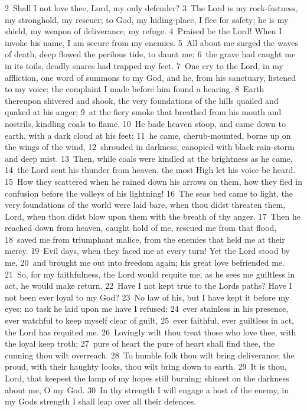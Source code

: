 \documentclass[10pt]{book} %
\begin{document}
\textcolor{benred8}{2}~Shall I not love thee, Lord, my only defender? \textcolor{benred8}{3}~The Lord is my rock-fastness, my stronghold, my rescuer; to God, my hiding-place, I flee for safety; he is my shield, my weapon of deliverance, my refuge. \textcolor{benred8}{4}~Praised be the Lord! When I invoke his name, I am secure from my enemies. \textcolor{benred8}{5}~All about me surged the waves of death, deep flowed the perilous tide, to daunt me; \textcolor{benred8}{6}~the grave had caught me in its toils, deadly snares had trapped my feet. \textcolor{benred8}{7}~One cry to the Lord, in my affliction, one word of summons to my God, and he, from his sanctuary, listened to my voice; the complaint I made before him found a hearing.
\textcolor{benred8}{8}~Earth thereupon shivered and shook, the very foundations of the hills quailed and quaked at his anger; \textcolor{benred8}{9}~at the fiery smoke that breathed from his mouth and nostrils, kindling coals to flame. \textcolor{benred8}{10}~He bade heaven stoop, and came down to earth, with a dark cloud at his feet; \textcolor{benred8}{11}~he came, cherub-mounted, borne up on the wings of the wind, \textcolor{benred8}{12}~shrouded in darkness, canopied with black rain-storm and deep mist. \textcolor{benred8}{13}~Then, while coals were kindled at the brightness as he came, \textcolor{benred8}{14}~the Lord sent his thunder from heaven, the most High let his voice be heard. \textcolor{benred8}{15}~How they scattered when he rained down his arrows on them, how they fled in confusion before the volleys of his lightning! \textcolor{benred8}{16}~The sea\textquotesingle s bed came to light, the very foundations of the world were laid bare, when thou didst threaten them, Lord, when thou didst blow upon them with the breath of thy anger. \textcolor{benred8}{17}~Then he reached down from heaven, caught hold of me, rescued me from that flood, \textcolor{benred8}{18}~saved me from triumphant malice, from the enemies that held me at their mercy. \textcolor{benred8}{19}~Evil days, when they faced me at every turn! Yet the Lord stood by me, \textcolor{benred8}{20}~and brought me out into freedom again; his great love befriended me.
\textcolor{benred8}{21}~So, for my faithfulness, the Lord would requite me, as he sees me guiltless in act, he would make return. \textcolor{benred8}{22}~Have I not kept true to the Lord\textquotesingle s paths? Have I not been ever loyal to my God? \textcolor{benred8}{23}~No law of his, but I have kept it before my eyes; no task he laid upon me have I refused; \textcolor{benred8}{24}~ever stainless in his presence, ever watchful to keep myself clear of guilt, \textcolor{benred8}{25}~ever faithful, ever guiltless in act, the Lord has requited me. \textcolor{benred8}{26}~Lovingly wilt thou treat those who love thee, with the loyal keep troth; \textcolor{benred8}{27}~pure of heart the pure of heart shall find thee, the cunning thou wilt overreach. \textcolor{benred8}{28}~To humble folk thou wilt bring deliverance; the proud, with their haughty looks, thou wilt bring down to earth. \textcolor{benred8}{29}~It is thou, Lord, that keepest the lamp of my hopes still burning; shinest on the darkness about me, O my God. \textcolor{benred8}{30}~In thy strength I will engage a host of the enemy, in my God\textquotesingle s strength I shall leap over all their defences.
\end{document}
